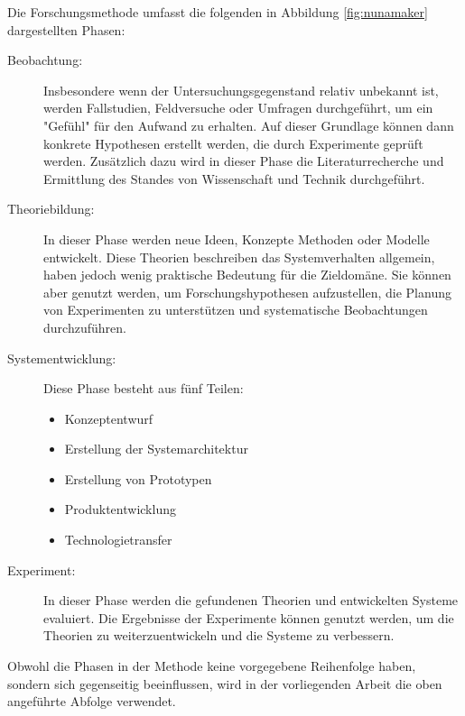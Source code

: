 Die Forschungsmethode umfasst die folgenden in Abbildung \ref{fig:nunamaker} dargestellten Phasen:
\begin{description}
\item[Beobachtung:] Insbesondere wenn der Untersuchungsgegenstand relativ unbekannt ist, werden Fallstudien, Feldversuche oder Umfragen durchgeführt, um ein "Gefühl" für den Aufwand zu erhalten. Auf dieser Grundlage können dann konkrete Hypothesen erstellt werden, die durch Experimente geprüft werden. Zusätzlich dazu wird in dieser Phase die Literaturrecherche und Ermittlung des Standes von Wissenschaft und Technik durchgeführt.

\item[Theoriebildung:] In dieser Phase werden neue Ideen, Konzepte Methoden oder Modelle entwickelt. Diese Theorien beschreiben das Systemverhalten allgemein, haben jedoch wenig praktische Bedeutung für die Zieldomäne. Sie können aber genutzt werden, um Forschungshypothesen aufzustellen, die Planung von Experimenten zu unterstützen und systematische Beobachtungen durchzuführen.

\item[Systementwicklung:] Diese Phase besteht aus fünf Teilen:
\begin{itemize}
\item Konzeptentwurf

\item Erstellung der Systemarchitektur

\item Erstellung von Prototypen

\item Produktentwicklung

\item Technologietransfer
\end{itemize}


\item[Experiment:] In dieser Phase werden die gefundenen Theorien und entwickelten Systeme evaluiert. Die Ergebnisse der Experimente können genutzt werden, um die Theorien zu weiterzuentwickeln und die Systeme zu verbessern.

\end{description}

Obwohl die Phasen in der Methode keine vorgegebene Reihenfolge haben, sondern sich gegenseitig beeinflussen, wird in der vorliegenden Arbeit die oben angeführte Abfolge verwendet.

